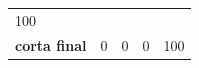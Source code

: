 \documentclass[]{article}
\begin{document}
\begin{longtable}[]{@{}lrrrr@{}}
\begin{minipage}[t]{0.17\columnwidth}
100\strut
\end{minipage}\tabularnewline
\begin{minipage}[t]{0.20\columnwidth}\raggedright\strut
\textbf{corta final}\strut
\end{minipage} & \begin{minipage}[t]{0.17\columnwidth}\raggedleft\strut
0\strut
\end{minipage} & \begin{minipage}[t]{0.17\columnwidth}\raggedleft\strut
0\strut
\end{minipage} & \begin{minipage}[t]{0.17\columnwidth}\raggedleft\strut
0\strut
\end{minipage} & \begin{minipage}[t]{0.17\columnwidth}\raggedleft\strut
100\strut
\end{minipage}\tabularnewline
\bottomrule
\end{longtable}
\end{document}
